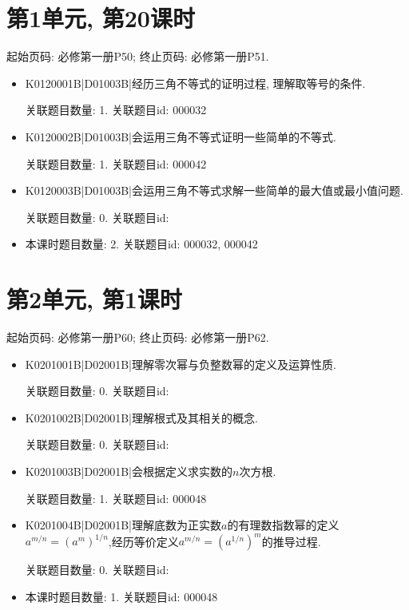\section*{第1单元, 第20课时}
起始页码: 必修第一册P50; 终止页码: 必修第一册P51.
\begin{itemize}
\item K0120001B|D01003B|经历三角不等式的证明过程, 理解取等号的条件.

关联题目数量: 1. 关联题目id: 000032

\item K0120002B|D01003B|会运用三角不等式证明一些简单的不等式.

关联题目数量: 1. 关联题目id: 000042

\item K0120003B|D01003B|会运用三角不等式求解一些简单的最大值或最小值问题.

关联题目数量: 0. 关联题目id: 

\item 本课时题目数量: 2. 关联题目id: 000032, 000042

\end{itemize}

\section*{第2单元, 第1课时}
起始页码: 必修第一册P60; 终止页码: 必修第一册P62.
\begin{itemize}
\item K0201001B|D02001B|理解零次幂与负整数幂的定义及运算性质.

关联题目数量: 0. 关联题目id: 

\item K0201002B|D02001B|理解根式及其相关的概念.

关联题目数量: 0. 关联题目id: 

\item K0201003B|D02001B|会根据定义求实数的$n$次方根.

关联题目数量: 1. 关联题目id: 000048

\item K0201004B|D02001B|理解底数为正实数$a$的有理数指数幂的定义$a^{m/n}=(a^{m})^{1/n}$,经历等价定义$a^{m/n}= (a^{1/n})^{m}$的推导过程.

关联题目数量: 0. 关联题目id: 

\item 本课时题目数量: 1. 关联题目id: 000048

\end{itemize}

